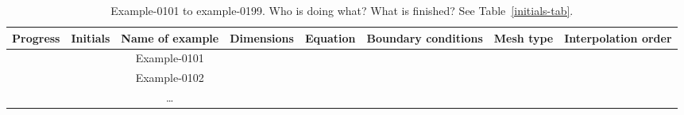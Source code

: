 %
\clearpage
%
\begin{sidewaystable}[h!]
    \centering
    \begin{tabular}{ c | c | c | c | c | c | c | c }
        Progress & Initials & Name of example & Dimensions & Equation & Boundary conditions & Mesh type & Interpolation order \\
        \midrule
                 &          & Example-0101 &    &         &           &           \\
                 &          & Example-0102 &    &         &           &           \\
                 &          & \ldots \\
    \end{tabular}
    \caption{Example-0101 to example-0199. Who is doing what? What is finished? See Table~\ref{initials-tab}.}
    \label{progress-x1xx-tab}
\end{sidewaystable}
%
